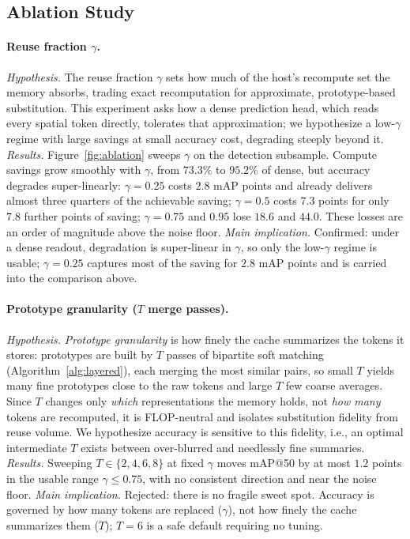 \documentclass[letterpaper]{article}
\begin{document}
\subsection{Ablation Study}
\label{sec:eval-ablation}

\paragraph{Reuse fraction $\gamma$.}
\emph{Hypothesis.} The reuse fraction $\gamma$ sets how much of the
host's recompute set the memory absorbs, trading exact recomputation
for approximate, prototype-based substitution. This experiment asks how
a dense prediction head, which reads every spatial token directly,
tolerates that approximation; we hypothesize a low-$\gamma$ regime with
large savings at small accuracy cost, degrading steeply beyond it.
%
\emph{Results.} Figure~\ref{fig:ablation} sweeps $\gamma$ on the
detection subsample. Compute savings grow
smoothly with $\gamma$, from $73.3\%$ to $95.2\%$ of dense, but
accuracy degrades super-linearly: $\gamma = 0.25$ costs $2.8$ mAP
points and already delivers almost three quarters of the achievable
saving; $\gamma = 0.5$ costs $7.3$ points for only $7.8$ further
points of saving; $\gamma = 0.75$ and $0.95$ lose $18.6$ and $44.0$.
These losses are an order of magnitude above the noise floor.
%
\emph{Main implication.} Confirmed: under a dense readout, degradation
is super-linear in $\gamma$, so only the low-$\gamma$ regime is usable;
$\gamma = 0.25$ captures most of the saving for $2.8$ mAP points and is
carried into the comparison above.

\paragraph{Prototype granularity ($T$ merge passes).}
\emph{Hypothesis.} \emph{Prototype granularity} is how finely the cache
summarizes the tokens it stores: prototypes are built by $T$ passes of
bipartite soft matching (Algorithm~\ref{alg:layered}), each merging the
most similar pairs, so small $T$ yields many fine prototypes close to
the raw tokens and large $T$ few coarse averages. Since $T$ changes
only \emph{which} representations the memory holds, not \emph{how many}
tokens are recomputed, it is FLOP-neutral and isolates substitution
fidelity from reuse volume. We hypothesize accuracy is sensitive to
this fidelity, i.e., an optimal intermediate $T$ exists between
over-blurred and needlessly fine summaries.
%
\emph{Results.} Sweeping $T \in \{2,4,6,8\}$ at fixed $\gamma$ moves
mAP@50 by at most $1.2$ points in the usable range $\gamma \le 0.75$,
with no consistent direction and near the noise floor.
%
\emph{Main implication.} Rejected: there is no fragile sweet spot.
Accuracy is governed by how many tokens are replaced ($\gamma$), not
how finely the cache summarizes them ($T$); $T = 6$ is a safe default
requiring no tuning.
\end{document}
